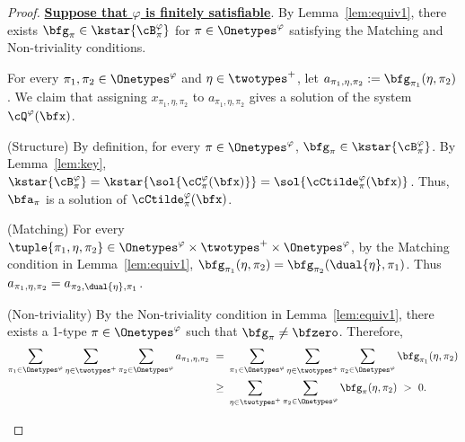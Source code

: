 \begin{proof}
    \textbf{\uline{Suppose that $\varphi$ is finitely satisfiable}}.
    By Lemma~\ref{lem:equiv1},
    there exists $\bfg_\pi \in \kstar{\cB^\varphi_\pi}$ for $\pi \in \Onetypes^\varphi$
    satisfying the Matching and Non-triviality conditions.

    For every $\pi_1, \pi_2 \in \Onetypes^\varphi$ and $\eta \in \twotypes^+$,
    let
    $a_{\pi_1, \eta, \pi_2} := \bfg_{\pi_1}(\eta, \pi_2)$.
    We claim that assigning  $x_{\pi_1, \eta, \pi_2}$ to $a_{\pi_1, \eta, \pi_2}$ gives a solution of the system $\cQ^\varphi(\bfx)$.
    \begin{compactitem}
        \item (Structure)
        By definition, for every $\pi \in \Onetypes^\varphi$,
        $\bfg_\pi \in \kstar{\cB^\varphi_\pi}$.
        By Lemma~\ref{lem:key},
        $\kstar{\cB^\varphi_\pi}
        = \kstar{\sol{\cC^\varphi_\pi(\bfx)}}
        = \sol{\cCtilde^\varphi_\pi(\bfx)}$.
        Thus, $\bfa_\pi$ is a solution of $\cCtilde^\varphi_\pi(\bfx)$.
        
        \item (Matching) For every $\tuple{\pi_1, \eta, \pi_2} \in \Onetypes^\varphi \times \twotypes^+ \times \Onetypes^\varphi$,
        by the Matching condition in Lemma~\ref{lem:equiv1},
        $\bfg_{\pi_1}(\eta, \pi_2) = \bfg_{\pi_2}(\dual{\eta}, \pi_1)$.
        Thus $a_{\pi_1, \eta, \pi_2} = a_{\pi_2, \dual{\eta}, \pi_1}$.

        \item (Non-triviality) By the Non-triviality condition in Lemma~\ref{lem:equiv1},
        there exists a 1-type $\pi \in \Onetypes^\varphi$
        such that $\bfg_\pi \neq \bfzero$.
        Therefore, 
        \begin{equation*}
            \begin{aligned}
                \sum_{\pi_1 \in \Onetypes^\varphi}
                \sum_{\eta \in \twotypes^+}\sum_{\pi_2 \in \Onetypes^\varphi} a_{\pi_1, \eta, \pi_2}
                \ =\ &
                \sum_{\pi_1 \in \Onetypes^\varphi}
                \sum_{\eta \in \twotypes^+}\sum_{\pi_2 \in \Onetypes^\varphi} \bfg_{\pi_1}(\eta, \pi_2) \\
                \ \ge\ &
                \sum_{\eta \in \twotypes^+}\sum_{\pi_2 \in \Onetypes^\varphi} \bfg_{\pi}(\eta, \pi_2) 
                \ >\ 0.
            \end{aligned}
        \end{equation*}
    \end{compactitem}


\end{proof}
